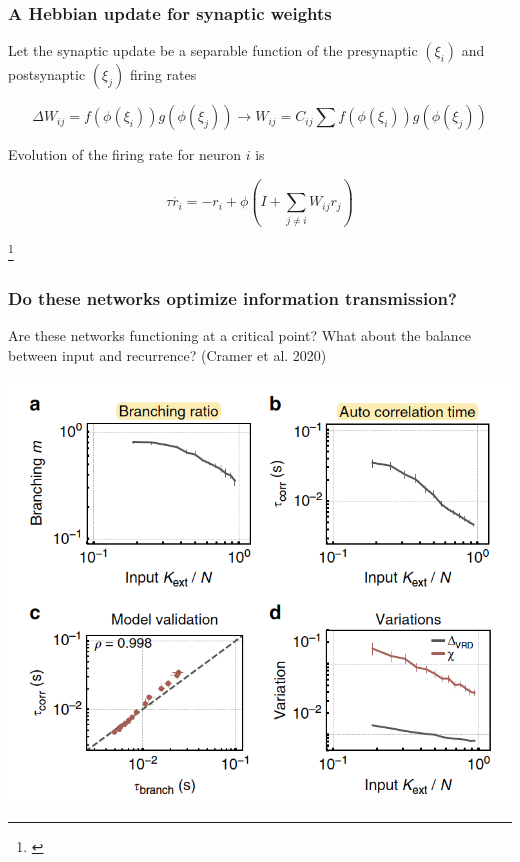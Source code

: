 \documentclass{beamer}
\begin{document}
\begin{frame}[plain]
\frametitle{A Hebbian update for synaptic weights}

Let the synaptic update be a separable function of the presynaptic $(\xi_{i})$ and postsynaptic $(\xi_{j})$ firing rates

\begin{equation*}
\Delta W_{ij} = f(\phi(\xi_{i}))g(\phi(\xi_{j})) \rightarrow W_{ij} = C_{ij}\sum  f(\phi(\xi_{i}))g(\phi(\xi_{j}))
\end{equation*}

\vspace{0.2in}

Evolution of the firing rate for neuron $i$ is

\begin{equation*}
\tau \dot{r_{i}} = -r_{i} + \phi(I + \sum_{j\neq i} W_{ij}r_{j})
\end{equation*}


\footnote{\cite{hopfield}}
\end{frame}


\begin{frame}[plain]
\frametitle{Do these networks optimize information transmission?} 

Are these networks functioning at a critical point? What about the balance between input and recurrence? (Cramer et al. 2020)

\begin{center}
\includegraphics[scale=0.55]{cramer-criticality}
\end{center}

\end{frame}
\end{document}
